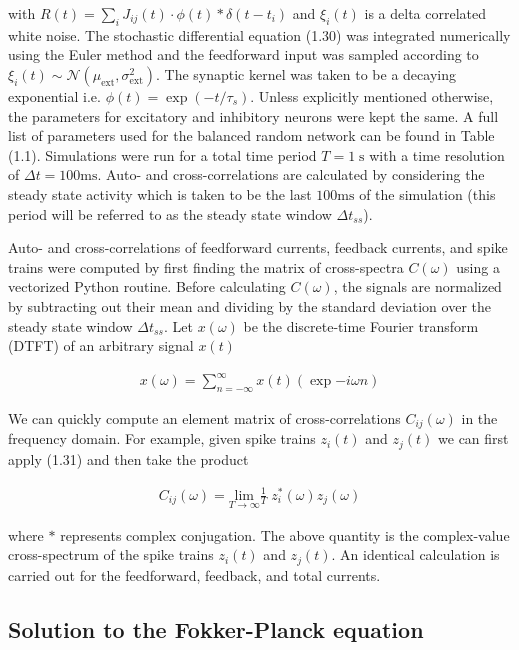 \documentclass{ucetd}
\begin{document}
with $R(t) = \sum_{i} J_{ij}(t)\cdot \phi(t) * \delta(t-t_{i})$ and $\xi_{i}(t)$ is a delta correlated white noise. The stochastic differential equation (1.30) was integrated numerically using the Euler method and the feedforward input was sampled according to $\xi_{i}(t) \sim \mathcal{N}(\mu_{\mathrm{ext}},\sigma_{\mathrm{ext}}^{2})$. The synaptic kernel was taken to be a decaying exponential i.e. $\phi(t) = \exp(-t/\tau_{s})$. Unless explicitly mentioned otherwise, the parameters for excitatory and inhibitory neurons were kept the same. A full list of parameters used for the balanced random network can be found in Table (1.1). Simulations were run for a total time period $T = 1 \;\mathrm{s}$ with a time resolution of $\Delta t = 100\mathrm{ms}$. Auto- and cross-correlations are calculated by considering the steady state activity which is taken to be the last $100\mathrm{ms}$ of the simulation (this period will be referred to as the steady state window $\Delta t_{ss}$).

Auto- and cross-correlations of feedforward currents, feedback currents, and spike trains were computed by first finding the matrix of cross-spectra $C(\omega)$ using a vectorized Python routine. Before calculating $C(\omega)$, the signals are normalized by subtracting out their mean and dividing by the standard deviation over the steady state window $\Delta t_{ss}$. Let $x(\omega)$ be the discrete-time Fourier transform (DTFT) of an arbitrary signal $x(t)$

\begin{align}
x(\omega) = \sum_{n =-\infty}^{\infty}x(t)\left(\exp{-i\omega n}\right)
\end{align}

We can quickly compute an element matrix of cross-correlations $C_{ij}(\omega)$ in the frequency domain. For example, given spike trains $z_{i}(t)$ and $z_{j}(t)$ we can first apply (1.31) and then take the product

\begin{align}
C_{ij}(\omega) = \underset{T\rightarrow\infty}{\mathrm{lim}}\frac{1}{T}\;z_{i}^{*}(\omega)z_{j}(\omega)
\end{align}

where $*$ represents complex conjugation. The above quantity is the complex-value cross-spectrum of the spike trains $z_{i}(t)$ and $z_{j}(t)$. An identical calculation is carried out for the feedforward, feedback, and total currents.

\subsection{Solution to the Fokker-Planck equation}
\end{document}
